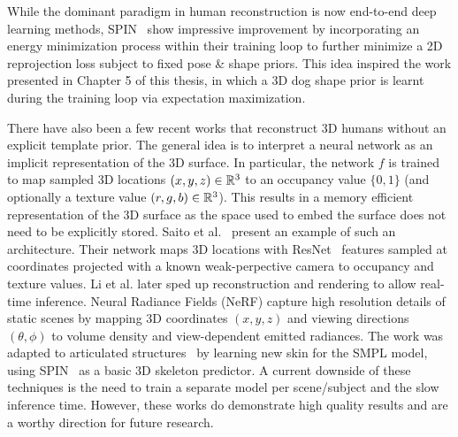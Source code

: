     While the dominant paradigm in human reconstruction is now end-to-end deep learning methods, SPIN~\cite{kolotouros19learning} show impressive improvement by incorporating an energy minimization process within their training loop to further minimize a 2D reprojection loss subject to fixed pose \& shape priors. This idea inspired the work presented in Chapter 5 of this thesis, in which a 3D dog shape prior is learnt during the training loop via expectation maximization.

    




    There have also been a few recent works that reconstruct 3D humans without an explicit template prior. The general idea is to interpret a neural network as an implicit representation of the 3D surface. In particular, the network $f$ is trained to map sampled 3D locations $(x,y,z) \in {\mathbb{R}^{3}}$ to an occupancy value $\{0,1\}$ (and optionally a texture value $(r,g,b) \in {\mathbb{R}^{3}}$). This results in a memory efficient representation of the 3D surface as the space used to embed the surface does not need to be explicitly stored. Saito et al.~\cite{pifuSHNMKL19,saito2020pifuhd} present an example of such an architecture. Their network maps 3D locations with ResNet~ features sampled at coordinates projected with a known weak-perpective camera to occupancy and texture values. Li et al. later sped up reconstruction and rendering to allow real-time inference. Neural Radiance Fields (NeRF) capture high resolution details of static scenes by mapping 3D coordinates $(x,y,z)$ and viewing directions $(\theta, \phi)$ to volume density and view-dependent emitted radiances. The work was adapted to articulated structures~ by learning new skin for the SMPL model, using SPIN~\cite{kolotouros19learning} as a basic 3D skeleton predictor. A current downside of these techniques is the need to train a separate model per scene/subject and the slow inference time. However, these works do demonstrate high quality results and are a worthy direction for future research.

